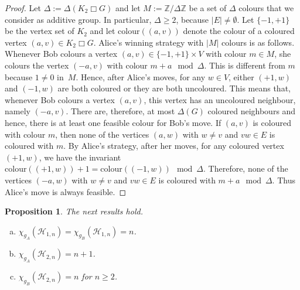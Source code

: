 \documentclass{article}
\newtheorem{prop}[thm]{Proposition}
\newcommand{\IZ}{\ensuremath{{\mathbb Z}}}
\newcommand{\chia}{\ensuremath{\chi_{g_A}}}
\newcommand{\chib}{\ensuremath{\chi_{g_B}}}
\begin{document}
\begin{proof}
Let $\Delta:=\Delta(K_2\Box G)$ and let $M:=\IZ/\Delta\IZ$ be a set of $\Delta$ colours that we consider as additive group. In particular, $\Delta\geq 2$, because $|E|\neq\emptyset$. Let $\{-1,+1\}$ be the vertex set of $K_2$ and let $\mathrm{colour}((a,v))$ denote the colour of a coloured vertex $(a,v)\in K_2\Box G$. Alice's winning strategy with $|M|$ colours is as follows. Whenever Bob colours a vertex $(a,v)\in\{-1,+1\}\times V$ with colour $m\in M$, she colours the vertex $(-a,v)$ with colour $m+a\mod\Delta$. This is different from $m$ because $1\neq0$ in~$M$. Hence, after Alice's moves, for any $w\in V$, either $(+1,w)$ and $(-1,w)$ are both coloured or they are both uncoloured. This means that, whenever Bob colours a vertex $(a,v)$, this vertex has an uncoloured neighbour, namely $(-a,v)$. There are, therefore, at most $\Delta(G)$ coloured neighbours and hence, there is at least one feasible colour for Bob's move. If $(a,v)$ is coloured with colour $m$, then none of the vertices $(a,w)$ with $w\neq v$ and $vw\in E$ is coloured with $m$. By Alice's
strategy, after her moves, for any coloured vertex $(+1,w)$, we have the invariant $\mathrm{colour}((+1,w))+1=\mathrm{colour}((-1,w))\mod\Delta$. Therefore, none of the vertices $(-a,w)$ with $w\neq v$ and $vw\in E$ is coloured with $m+a\mod\Delta$. Thus Alice's move is always feasible.
\end{proof}




\pagebreak[4]


\begin{prop} The next results hold.
\begin{enumerate}[a)]
\item $\chia(\mathcal{H}_{1,n})=\chib(\mathcal{H}_{1,n})=n$.
\item $\chia(\mathcal{H}_{2,n})=n+1$.
\item $\chib(\mathcal{H}_{2,n})=n$ for $n\ge2$.
\end{enumerate}
\end{prop}
\end{document}
